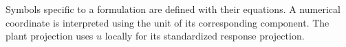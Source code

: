 \documentclass[12pt,twoside]{book}
\begin{document}
Symbols specific to a formulation are defined with their equations. A numerical coordinate is interpreted using the unit of its corresponding component. The plant projection uses $u$ locally for its standardized response projection.

\mainmatter
\pagestyle{headings}
\renewcommand{\chaptermark}[1]{\markboth{\chaptername\ \thechapter}{\chaptername\ \thechapter}}
\renewcommand{\sectionmark}[1]{}









\backmatter


\end{document}
